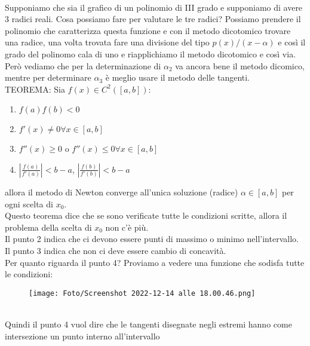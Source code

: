 \documentclass[a4paper, portrait]{book}
\numberwithin{equation}{chapter} %
\begin{document}
\\Supponiamo che sia il grafico di un polinomio di III grado e supponiamo di avere 3 radici reali. Cosa possiamo fare per valutare le tre radici? Possiamo prendere il polinomio che caratterizza questa funzione e con il metodo dicotomico trovare una radice, una volta trovata fare una divisione del tipo $p(x)/(x-\alpha)$ e così il grado del polinomo cala di uno e riapplichiamo il metodo dicotomico e così via.\\
Però vediamo che per la determinazione di $\alpha_2$ va ancora bene il metodo dicomico, mentre per determinare $\alpha_3$ è meglio usare il metodo delle tangenti.
\\TEOREMA: Sia $f(x) \in C^2([a,b])$:
\begin{enumerate}
    \item $f(a)f(b) < 0$
    \item $f'(x) \neq 0 \forall x \in [a,b]$
    \item $f''(x) \geq 0$ o $f''(x) \leq 0 \forall x \in [a,b]$
    \item $\left|\frac{f(a)}{f'(a)}\right| < b-a$, $\left|\frac{f(b)}{f'(b)}\right| < b-a$
\end{enumerate}
allora il metodo di Newton converge all'unica soluzione (radice) $\alpha \in [a,b]$ per ogni scelta di $x_0$.\\
Questo teorema dice che se sono verificate tutte le condizioni scritte, allora il problema della scelta di $x_0$ non c'è più.\\
Il punto 2 indica che ci devono essere punti di massimo o minimo nell'intervallo.\\
Il punto 3 indica che non ci deve essere cambio di concavità.\\
Per quanto riguarda il punto 4? Proviamo a vedere una funzione che sodisfa tutte le condizioni:
\begin{figure}[h!]
    \centering
    \texttt{[image: Foto/Screenshot 2022-12-14 alle 18.00.46.png]}
    \caption{}
\end{figure}
\\Quindi il punto 4 vuol dire che le tangenti disegnate negli estremi hanno come intersezione un punto interno all'intervallo
\end{document}
